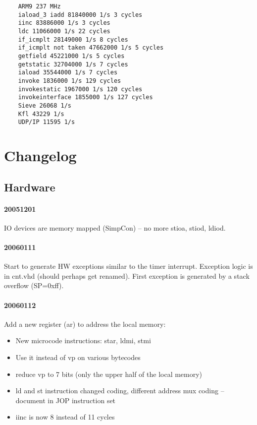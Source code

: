 \documentclass[a4paper,12pt]{scrartcl}
\newcommand{\code}[1]{{\textsf{#1}}}
\begin{document}
\begin{verbatim}
    ARM9 237 MHz
    iaload_3 iadd 81840000 1/s 3 cycles
    iinc 83886000 1/s 3 cycles
    ldc 11066000 1/s 22 cycles
    if_icmplt 28149000 1/s 8 cycles
    if_icmplt not taken 47662000 1/s 5 cycles
    getfield 45221000 1/s 5 cycles
    getstatic 32704000 1/s 7 cycles
    iaload 35544000 1/s 7 cycles
    invoke 1836000 1/s 129 cycles
    invokestatic 1967000 1/s 120 cycles
    invokeinterface 1855000 1/s 127 cycles
    Sieve 26068 1/s
    Kfl 43229 1/s
    UDP/IP 11595 1/s
\end{verbatim}

\section{Changelog}

\subsection{Hardware}


\paragraph{20051201}

IO devices are memory mapped (SimpCon) -- no more stioa, stiod,
ldiod.


\paragraph{20060111}

Start to generate HW exceptions similar to the timer interrupt.
Exception logic is in \code{cnt.vhd} (should perhaps get renamed).
First exception is generated by a stack overflow (SP=0xff).

\paragraph{20060112}

Add a new register (\code{ar}) to address the local memory:

\begin{itemize}
    \item New microcode instructions: star, ldmi, stmi
    \item Use it instead of vp on various bytecodes
    \item reduce vp to 7 bits (only the upper half of the local
        memory)
    \item ld and st instruction changed coding, different address
        mux coding -- document in JOP instruction set
    \item iinc is now 8 instead of 11 cycles
\end{itemize}
\end{document}
